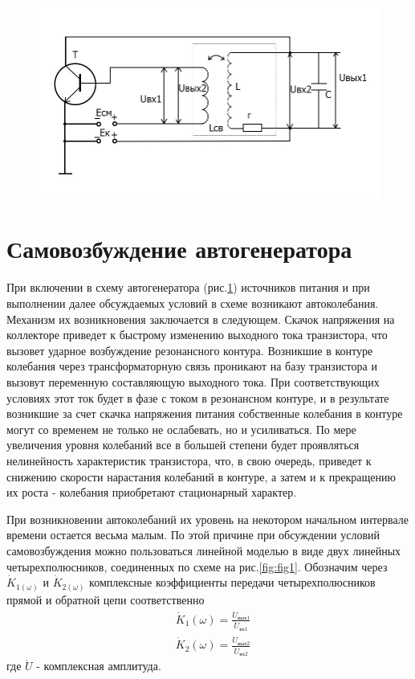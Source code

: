 \begin{figure}[h]
	\centering
	\includegraphics[width=0.8\linewidth]{circuit/fig2}
	\caption{}
	\label{fig:fig2}
\end{figure}

\section{Самовозбуждение автогенератора}
При включении в схему автогенератора (рис.\ref{fig:fig2}) источников питания и при выполнении далее обсуждаемых условий в схеме возникают автоколебания. Механизм их возникновения заключается в следующем. Скачок напряжения на коллекторе приведет к быстрому изменению выходного тока транзистора, что вызовет ударное возбуждение резонансного контура. Возникшие в контуре колебания через трансформаторную связь проникают на базу транзистора и вызовут переменную составляющую выходного тока. При соответствующих условиях этот ток будет в фазе с током в резонансном контуре, и в результате возникшие за счет скачка напряжения питания собственные колебания в контуре могут со временем не только не ослабевать, но и усиливаться. По мере увеличения уровня колебаний все в большей степени будет проявляться нелинейность характеристик транзистора, что, в свою очередь, приведет к снижению скорости нарастания колебаний в контуре, а затем и к прекращению их роста - колебания приобретают стационарный характер.

При возникновении автоколебаний их уровень на некотором начальном интервале времени остается весьма малым. По этой причине при обсуждении условий самовозбуждения можно пользоваться линейной моделью в виде двух линейных четырехполюсников, соединенных по схеме на рис.\ref{fig:fig1}. Обозначим через $\dot{K}_{1(\omega)}$ и $\dot{K}_{2(\omega)}$ комплексные коэффициенты передачи четырехполюсников прямой и обратной цепи соответственно
\begin{equation*}
\begin{aligned}
&\dot{K}_1(\omega)=\frac{\dot{U}_{\text{вых}1}}{\dot{U}_{\text{вх}1}} \\
&\dot{K}_2(\omega)=\frac{\dot{U}_{\text{вых}2}}{\dot{U}_{\text{вх}2}} 
\end{aligned}
\end{equation*}
где $\dot{U}$ - комплексная амплитуда.

